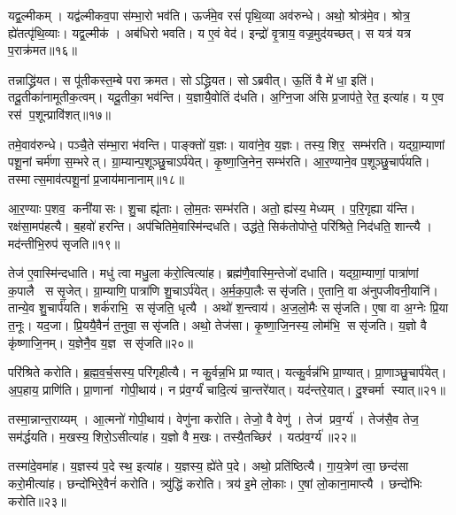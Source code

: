 यद्व॒ल्मीकम्। यद्व॑ल्मीकव॒पा स॑म्भा॒रो भव॑ति। ऊर्ज॑मे॒व रसं॑ पृथि॒व्या अव॑रुन्धे। अथो॒ श्रोत्र॑मे॒व। श्रोत्र॒ ह्ये॑तत्पृ॑थि॒व्याः। यद्व॒ल्मीक॑। अब॑धिरो भवति। य ए॒वं वेद॑। इन्द्रो॑ वृ॒त्राय॒ वज्र॒मुद॑यच्छत्। स यत्र॑ यत्र प॒राक्र॑मत॥१६॥

तन्नाद्ध्रि॑यत। स पू॑तीकस्त॒म्बे पराक्रमत। सोऽद्ध्रियत। सोऽब्रवीत्। ऊ॒तिं वै मे॑ धा॒ इति॑। तदू॒तीका॑नामूतीक॒त्वम्। यदू॒तीका॒ भव॑न्ति। य॒ज्ञायै॒वोतिं द॑धति। अ॒ग्नि॒जा अ॑सि प्र॒जाप॑ते॒ रेत॒ इत्या॑ह। य ए॒व रस॑ प॒शून्प्रावि॑शत्॥१७॥

तमे॒वाव॑रुन्धे। पञ्चै॒ते स॑म्भा॒रा भ॑वन्ति। पाङ्क्तो॑ य॒ज्ञः। यावा॑ने॒व य॒ज्ञः। तस्य॒ शिर॒ सम्भ॑रति। यद्ग्रा॒म्याणां पशू॒नां चर्म॑णा स॒म्भरेत्। ग्रा॒म्यान्प॒शूञ्छु॒चाऽर्प॑येत्। कृ॒ष्णा॒जि॒नेन॒ सम्भ॑रति। आ॒र॒ण्याने॒व प॒शूञ्छु॒चार्प॑यति। तस्मात्स॒माव॑त्पशू॒नां प्र॒जाय॑मानानाम्॥१८॥

आ॒र॒ण्याः प॒शव॒ कनी॑यासः। शु॒चा ह्यृ॑ताः। लो॒म॒तः सम्भ॑रति। अतो॒ ह्य॑स्य॒ मेध्यम्। प॒रि॒गृह्या य॑न्ति। रक्ष॑सा॒मप॑हत्यै। ब॒हवो॑ हरन्ति। अप॑चितिमे॒वास्मि॑न्दधति। उद्ध॑ते॒ सिक॑तोपोप्ते॒ परि॑श्रिते॒ निद॑धति॒ शान्त्यै। मद॑न्तीभि॒रुप॑ सृजति॥१९॥

तेज॑ ए॒वास्मि॑न्दधाति। मधु॑ त्वा मधु॒ला क॑रो॒त्वित्या॑ह। ब्रह्म॑णै॒वास्मि॒न्तेजो॑ दधाति। यद्ग्रा॒म्याणां॒ पात्रा॑णां क॒पालै ससृ॒जेत्। ग्रा॒म्याणि॒ पात्रा॑णि शु॒चाऽर्प॑येत्। अ॒र्म॒क॒पा॒लैः ससृ॑जति। ए॒तानि॒ वा अ॑नुपजीवनी॒यानि॑। तान्ये॒व शु॒चार्प॑यति। शर्क॑राभि॒ ससृ॑जति॒ धृत्यै। अथो॑ श॒न्त्वाय॑। अ॒ज॒लो॒मैः ससृ॑जति। ए॒षा वा अ॒ग्नेः प्रि॒या त॒नूः। यद॒जा। प्रि॒ययै॒वैनं॑ त॒नुवा॒ ससृ॑जति। अथो॒ तेज॑सा। कृ॒ष्णा॒जि॒नस्य॒ लोम॑भि॒ ससृ॑जति। य॒ज्ञो वै कृ॑ष्णाजि॒नम्। य॒ज्ञेनै॒व य॒ज्ञ ससृ॑जति॥२०॥
\anuvakamend[या॒ज्या॑यै॒ न जु॑हु॒यादवि॑श॒द्वेणु॒ शान्त्यै॑ प॒ङ्क्तिरा॑धस॒मित्या॑ह हरति दिहन्ति प॒राक्र॑म॒तावि॑शत् प्र॒जाय॑मानाना सृजति श॒न्त्वाया॒ष्टौ च॑]

परि॑श्रिते करोति। ब्र॒ह्म॒व॒र्च॒सस्य॒ परि॑गृहीत्यै। न कु॒र्वन्न॒भि प्राण्यात्। यत्कु॒र्वन्न॑भि प्रा॒ण्यात्। प्रा॒णाञ्छु॒चार्प॑येत्। अ॒प॒हाय॒ प्राणि॑ति। प्रा॒णानां गोपी॒थाय॑। न प्र॑व॒र्ग्यं॑ चादि॒त्यं चा॒न्तरे॑यात्। यद॑न्तरे॒यात्। दु॒श्चर्मा स्यात्॥२१॥

तस्मा॒न्नान्त॒राय्यम्। आ॒त्मनो॑ गोपी॒थाय॑। वेणु॑ना करोति। तेजो॒ वै वेणु॑। तेज॑ प्रव॒र्ग्य॑। तेज॑सै॒व तेज॒ सम॑र्द्धयति। म॒खस्य॒ शिरो॒ऽसीत्या॑ह। य॒ज्ञो वै म॒खः। तस्यै॒तच्छिर॑। यत्प्र॑व॒र्ग्य॑॥२२॥

तस्मा॑दे॒वमा॑ह। य॒ज्ञस्य॑ प॒दे स्थ॒ इत्या॑ह। य॒ज्ञस्य॒ ह्ये॑ते प॒दे। अथो॒ प्रति॑ष्ठित्यै। गा॒य॒त्रेण॑ त्वा॒ छन्द॑सा करो॒मीत्या॑ह। छन्दो॑भिरे॒वैनं॑ करोति। त्र्यु॑द्धिं करोति। त्रय॑ इ॒मे लो॒काः। ए॒षां लो॒काना॒माप्त्यै। छन्दो॑भिः करोति॥२३॥

